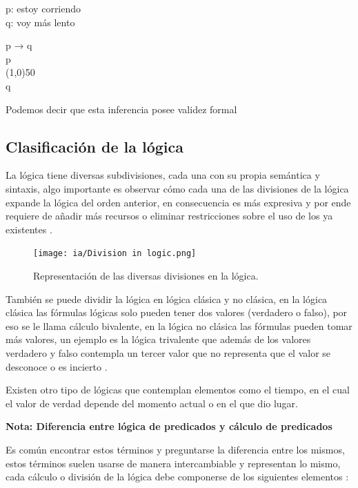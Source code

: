 \documentclass[11pt,fleqn]{book} %
\begin{document}
p: estoy corriendo \\
q: voy más lento

p → q\\
p \\
\line(1,0){50}\\
q

Podemos decir que esta inferencia posee validez formal

\subsection{Clasificación de la lógica} 

La lógica tiene diversas subdivisiones, cada una con su propia semántica y sintaxis, algo importante es observar cómo cada una de las divisiones de la lógica expande la lógica del orden anterior, en consecuencia es más expresiva y por ende requiere de añadir más recursos o eliminar restricciones sobre el uso de los ya existentes \cite{munoz2013introduccion}.


\begin{figure}[ht]
\centering\texttt{[image: ia/Division in logic.png]}
\caption{Representación de las diversas divisiones en la lógica.}

\label{fig:Division-in-logic} 
\end{figure}

\FloatBarrier
También se puede dividir la lógica en lógica clásica y no clásica, en la lógica clásica las fórmulas lógicas solo pueden tener dos valores (verdadero o falso), por eso se le llama cálculo bivalente, en la lógica no clásica las fórmulas pueden tomar más valores, un ejemplo es la lógica trivalente que además de los valores verdadero y falso contempla un tercer valor que no representa que el valor se desconoce o es incierto \cite{munoz2013introduccion}.

Existen otro tipo de lógicas que contemplan elementos como el tiempo, en el cual el valor de verdad depende del momento actual o en el que dio lugar.

\textbf{Nota: Diferencia entre lógica de predicados y cálculo de predicados}

Es común encontrar estos términos y preguntarse la diferencia entre los mismos, estos términos suelen usarse de manera intercambiable y representan lo mismo, cada cálculo o división de la lógica debe componerse de los siguientes elementos \cite{munoz2013introduccion}:
\end{document}
